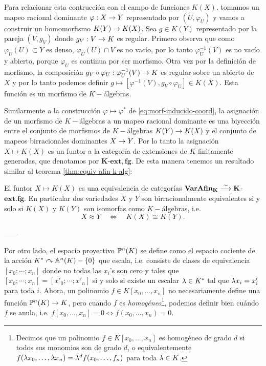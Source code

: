 Para relacionar esta contrucción con el campo de funciones $K(X)$, tomamos un mapeo racional dominante $\varphi:X\rightarrow Y$ representado por $(U,\varphi_U)$ y vamos a construir un homomorfismo $K(Y)\rightarrow K(X)$. Sea $g\in K(Y)$ representado por la pareja $(V,g_V)$ donde $g_V:V\rightarrow K$ es regular. Primero observa que como $\varphi_U(U)\subset Y$ es denso, $\varphi_U(U)\cap V$ es no vacío, por lo tanto $\varphi^{-1}_U(V)$ es no vacío y abierto, porque $\varphi_U$ es continua por ser morfismo. Otra vez por la definición de morfismo, la composición $g_V\circ\varphi_U:\varphi_U^{-1}(V)\rightarrow K$ es regular sobre un abierto de $X$ y por lo tanto podemos definir $g\mapsto[\varphi^{-1}(V),g_V\circ\varphi_U]\in K(X)$. Esta función es un morfismo de $K-$álgebras.

Similarmente a la construcción $\varphi\mapsto\varphi^*$ de \eqref{eq:morf-inducido-coord}, la asignación de un morfismo de $K-$álgebras a un mapeo racional dominante es una biyección entre el conjunto de morfismos de $K-$álgebras $K(Y)\rightarrow K(X)$ y el conjunto de mapeos birracionales dominantes $X\rightarrow Y$. Por lo tanto la asignación $X\mapsto K(X)$ es un funtor a la categoría de extensiones de $K$ finitamente generadas, que denotamos por $\mathbf{K}$-$\mathbf{ext,fg}$. De esta manera tenemos un resultado similar al teorema \ref{thm:equiv-afin-k-alg}:

\begin{thm}
	El funtor $X\mapsto K(X)$ es una equivalencia de categorías $\mathbf{VarAfin_K} \overset{\sim}{\longrightarrow}\mathbf{K}$-$\mathbf{ext.fg}$. En particular dos variedades $X$ y $Y$ son birracionalmente equivalentes si y solo si $K(X)$ y $K(Y)$ son isomorfas como $K-$álgebras, i.e.
	\[
		X\approx Y\quad\iff\quad K(X)\cong K(Y).
	\]
\end{thm}


------

Por otro lado, el espacio proyectivo $\mathbb{P}^n(K)$ se define como el espacio cociente de la acción $K^*\curvearrowright\mathbb{A}^n(K)-\{0\}$ que escala, i.e. consiste de clases de equivalencia $[x_0;\cdots;x_n]$ donde no todas las $x_i$'s son cero y tales que $[x_0;\cdots;x_n]=[x'_0;\cdots;x'_n]$ si y solo si existe un escalar $\lambda\in K^*$ tal que $\lambda x_i=x'_i$ para toda $i$. Ahora, un polinomio $f\in K[x_0,\ldots,x_n]$ no necesariamente define una función $\mathbb{P}^n(K)\rightarrow K$, pero cuando $f$ es \emph{homogéneo}\footnote{Decimos que un polinomio $f\in K[x_0,\ldots,x_n]$ es homogéneo de grado $d$ si todos sus monomios son de grado $d$, o equivalentemente $f(\lambda x_0,\ldots,\lambda x_n)=\lambda^d f(x_0,\ldots,f_n)$ para toda $\lambda\in K$.}, podemos definir bien cuándo $f$ se anula, i.e. $f[x_0,\ldots,x_n]=0\iff f(x_0,\ldots,x_n)=0$.

